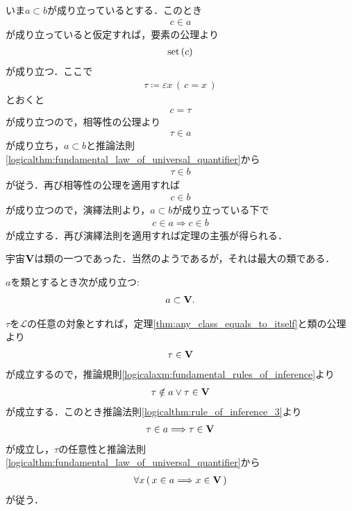 	\begin{prf}	
		いま$a \subset b$が成り立っているとする．このとき
		\begin{align}
			c \in a
		\end{align}
		が成り立っていると仮定すれば，要素の公理より
		\begin{align}
			\operatorname*{set} \left(c\right)
		\end{align}
		が成り立つ．ここで
		\begin{align}
			\tau \coloneqq \varepsilon x\, (\, c=x\, )
		\end{align}
		とおくと
		\begin{align}
			c = \tau
		\end{align}
		が成り立つので，相等性の公理より
		\begin{align}
			\tau \in a
		\end{align}
		が成り立ち，$a \subset b$と推論法則\ref{logicalthm:fundamental_law_of_universal_quantifier}から
		\begin{align}
			\tau \in b
		\end{align}
		が従う．再び相等性の公理を適用すれば
		\begin{align}
			c \in b
		\end{align}
		が成り立つので，演繹法則より，$a \subset b$が成り立っている下で
		\begin{align}
			c \in a \Longrightarrow c \in b
		\end{align}
		が成立する．再び演繹法則を適用すれば定理の主張が得られる．
		\QED
	\end{prf}
	
	宇宙$\mathbf{V}$は類の一つであった．当然のようであるが，それは最大の類である．
	\begin{screen}
		\begin{thm}
			$a$を類とするとき次が成り立つ:
			\begin{align}
				a \subset \mathbf{V}.
			\end{align}
		\end{thm}
	\end{screen}
	
	\begin{prf}
		$\tau$を$\mathcal{L}$の任意の対象とすれば，定理\ref{thm:any_class_equals_to_itself}と類の公理より
		\begin{align}
			\tau \in \mathbf{V}
		\end{align}
		が成立するので，推論規則\ref{logicalaxm:fundamental_rules_of_inference}より
		\begin{align}
			\tau \notin a \vee \tau \in \mathbf{V}
		\end{align}
		が成立する．このとき推論法則\ref{logicalthm:rule_of_inference_3}より
		\begin{align}
			\tau \in a \Longrightarrow \tau \in \mathbf{V}
		\end{align}
		が成立し，$\tau$の任意性と推論法則\ref{logicalthm:fundamental_law_of_universal_quantifier}から
		\begin{align}
			\forall x\, (\, x \in a \Longrightarrow x \in \mathbf{V}\, )
		\end{align}
		が従う．
		\QED
	\end{prf}
	
